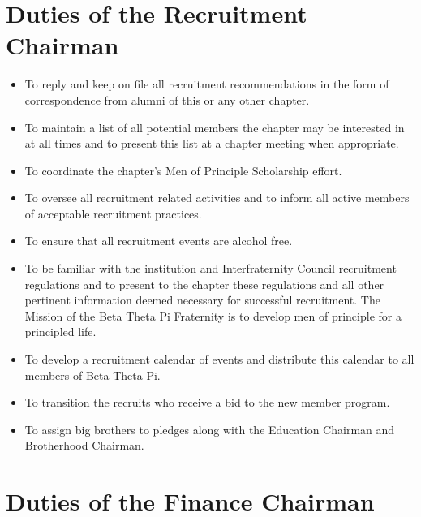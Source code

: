 \section{Duties of the Recruitment Chairman}
\label{sec:duties-of-the-recruitment-chairman}

\begin{itemize}

\item To reply and keep on file all recruitment recommendations in the form of
correspondence from alumni of this or any other chapter.  \item To maintain a
list of all potential members the chapter may be interested in at all times and
to present this list at a chapter meeting when appropriate.
\item To coordinate the chapter’s Men of Principle Scholarship effort. 
\item To oversee all recruitment related activities and to inform all active
members of acceptable recruitment practices. 
\item To ensure that all recruitment events are alcohol free. 
\item To be familiar with the institution and Interfraternity Council
recruitment regulations and to present to the chapter these regulations and all
other pertinent information deemed necessary for successful recruitment.
The Mission of the Beta Theta Pi Fraternity is to develop men of principle for
a principled life. 
\item To develop a recruitment calendar of events and distribute this calendar
to all members of Beta Theta Pi. 
\item To transition the recruits who receive a bid to the new member program.
\item To assign big brothers to pledges along with the Education Chairman and
Brotherhood Chairman.
\end{itemize}

\section{Duties of the Finance Chairman}
\label{sec:duties-of-the-finance-chaiman}

